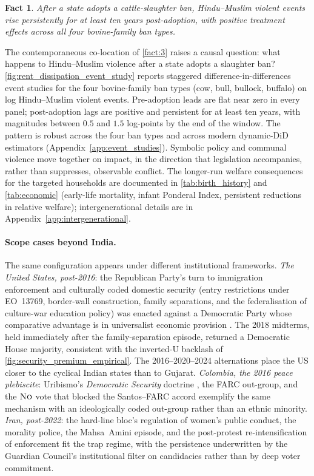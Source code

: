 \documentclass[11pt,twoside]{extarticle}
\newtheorem{fact}{Fact}
\begin{document}
\begin{fact}\label{fact:4}
After a state adopts a cattle-slaughter ban, Hindu--Muslim violent events rise persistently for at least ten years post-adoption, with positive treatment effects across all four bovine-family ban types.
\end{fact}

The contemporaneous co-location of \autoref{fact:3} raises a causal question: what happens to Hindu--Muslim violence after a state adopts a slaughter ban? \autoref{fig:rent_dissipation_event_study} reports staggered difference-in-differences event studies for the four bovine-family ban types (cow, bull, bullock, buffalo) on log Hindu--Muslim violent events. Pre-adoption leads are flat near zero in every panel; post-adoption lags are positive and persistent for at least ten years, with magnitudes between $0.5$ and $1.5$ log-points by the end of the window. The pattern is robust across the four ban types and across modern dynamic-DiD estimators (Appendix~\ref{app:event_studies}). Symbolic policy and communal violence move together on impact, in the direction that legislation accompanies, rather than suppresses, observable conflict. The longer-run welfare consequences for the targeted households are documented in \autoref{tab:birth_history} and \autoref{tab:economic} (early-life mortality, infant Ponderal Index, persistent reductions in relative welfare); intergenerational details are in Appendix~\ref{app:intergenerational}.

\paragraph{Scope cases beyond India.} The same configuration appears under different institutional frameworks. \emph{The United States, post-2016}: the Republican Party's turn to immigration enforcement and culturally coded domestic security (entry restrictions under EO~13769, border-wall construction, family separations, and the federalisation of culture-war education policy) was enacted against a Democratic Party whose comparative advantage is in universalist economic provision \citep*{handan-naderPolarizationStateLegislative2025}. The 2018 midterms, held immediately after the family-separation episode, returned a Democratic House majority, consistent with the inverted-U backlash of \autoref{fig:security_premium_empirical}. The 2016--2020--2024 alternations place the US closer to the cyclical Indian states than to Gujarat. \emph{Colombia, the 2016 peace plebiscite}: Uribismo's \emph{Democratic Security} doctrine \citep*{acostaFabricatingCommunistsImagined2025}, the FARC out-group, and the $\textsc{No}$ vote that blocked the Santos--FARC accord exemplify the same mechanism with an ideologically coded out-group rather than an ethnic minority. \emph{Iran, post-2022}: the hard-line bloc's regulation of women's public conduct, the morality police, the Mahsa~Amini episode, and the post-protest re-intensification of enforcement \citep*{keshavarzianBazaarStateIran2007,kurzmanUnthinkableRevolutionIran2004} fit the trap regime, with the persistence underwritten by the Guardian Council's institutional filter on candidacies rather than by deep voter commitment.
\end{document}
